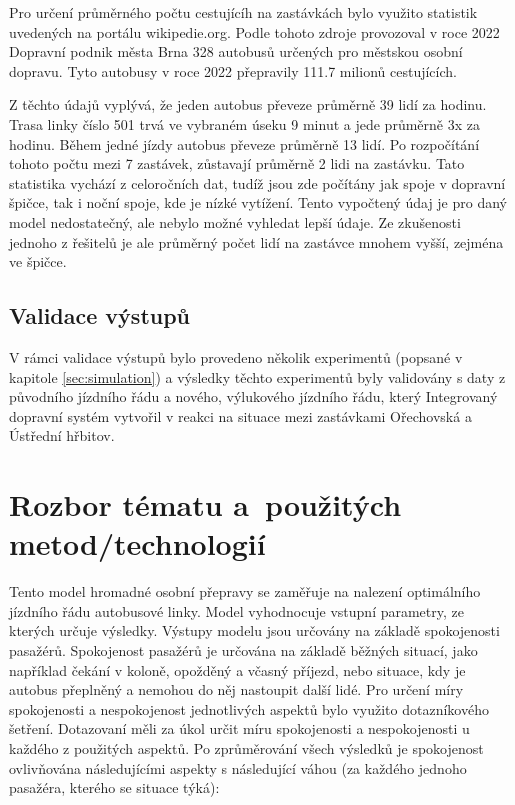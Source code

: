 \documentclass[a4paper]{article}
\begin{document}
            Pro určení průměrného počtu cestujícíh na zastávkách bylo využito statistik \cite{Pocet_cestujicich} uvedených na portálu wikipedie.org. Podle tohoto zdroje provozoval v roce 2022 Dopravní podnik města Brna 328 autobusů určených pro městskou osobní dopravu. Tyto autobusy v roce 2022 přepravily 111.7 milionů cestujících. 
            
            Z těchto údajů vyplývá, že jeden autobus převeze průměrně 39 lidí za hodinu. Trasa linky číslo 501 trvá ve vybraném úseku 9 minut a jede průměrně 3x za hodinu. Během jedné jízdy autobus převeze průměrně 13 lidí. 
            Po rozpočítání tohoto počtu mezi 7 zastávek, zůstavají průměrně 2 lidi na zastávku.
            Tato statistika vychází z celoročních dat, tudíž jsou zde počítány jak spoje v dopravní špičce, tak i noční spoje, kde je nízké vytížení. Tento vypočtený údaj je pro daný model nedostatečný, ale nebylo možné vyhledat lepší údaje. Ze zkušenosti jednoho z řešitelů je ale průměrný počet lidí na zastávce mnohem vyšší, zejména ve špičce.

        \subsection{Validace výstupů}
        \label{subsec:validation}
        V rámci validace výstupů bylo provedeno několik experimentů (popsané v kapitole \ref{sec:simulation}) a výsledky těchto experimentů byly validovány s daty z původního jízdního řádu a nového, výlukového jízdního řádu, který Integrovaný dopravní systém vytvořil v reakci na situace mezi zastávkami Ořechovská a Ústřední hřbitov. 
	
\newpage
    \section{Rozbor tématu a~použitých metod/technologií}
    \label{sec:methods}
   		Tento model hromadné osobní přepravy se zaměřuje na nalezení optimálního jízdního řádu autobusové linky. Model vyhodnocuje vstupní parametry, ze kterých určuje výsledky. Výstupy modelu jsou určovány na základě spokojenosti pasažérů. Spokojenost pasažérů je určována na základě běžných situací, jako například čekání v koloně, opožděný a včasný příjezd, nebo situace, kdy je autobus přeplněný a nemohou do něj nastoupit další lidé. Pro určení míry spokojenosti a nespokojenost jednotlivých aspektů bylo využito dotazníkového šetření. Dotazovaní měli za úkol určit míru spokojenosti a nespokojenosti u každého z použitých aspektů. Po zprůměrování všech výsledků je spokojenost ovlivňována následujícími aspekty s následující váhou (za každého jednoho pasažéra, kterého se situace týká): 
   		
\end{document}
